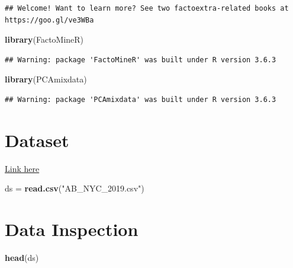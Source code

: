 \documentclass[
]{article}
\newenvironment{Shaded}{\begin{snugshade}}{\end{snugshade}}
\newcommand{\KeywordTok}[1]{\textcolor[rgb]{0.13,0.29,0.53}{\textbf{#1}}}
\newcommand{\NormalTok}[1]{#1}
\newcommand{\StringTok}[1]{\textcolor[rgb]{0.31,0.60,0.02}{#1}}
\begin{document}
\begin{verbatim}
## Welcome! Want to learn more? See two factoextra-related books at https://goo.gl/ve3WBa
\end{verbatim}

\begin{Shaded}
\begin{Highlighting}[]
\KeywordTok{library}\NormalTok{(FactoMineR)}
\end{Highlighting}
\end{Shaded}

\begin{verbatim}
## Warning: package 'FactoMineR' was built under R version 3.6.3
\end{verbatim}

\begin{Shaded}
\begin{Highlighting}[]
\KeywordTok{library}\NormalTok{(PCAmixdata)}
\end{Highlighting}
\end{Shaded}

\begin{verbatim}
## Warning: package 'PCAmixdata' was built under R version 3.6.3
\end{verbatim}

\hypertarget{dataset}{%
\section{Dataset}\label{dataset}}

\href{https://www.kaggle.com/dgomonov/new-york-city-airbnb-open-data}{Link
here}

\begin{Shaded}
\begin{Highlighting}[]
\NormalTok{ds =}\StringTok{ }\KeywordTok{read.csv}\NormalTok{(}\StringTok{"AB_NYC_2019.csv"}\NormalTok{)}
\end{Highlighting}
\end{Shaded}

\hypertarget{data-inspection}{%
\section{Data Inspection}\label{data-inspection}}

\begin{Shaded}
\begin{Highlighting}[]
\KeywordTok{head}\NormalTok{(ds)}
\end{Highlighting}
\end{Shaded}
\end{document}
